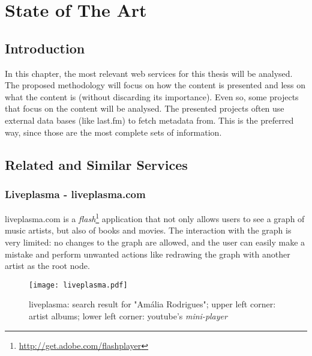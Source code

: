 
\chapter{State of The Art} \label{chap:chap2}

\section*{}


\section{Introduction}

In this chapter, the most relevant web services for this thesis will be analysed.
The proposed methodology will focus on how the content is presented and less on what the content is (without discarding its importance).
Even so, some projects that focus on the content will be analysed.
The presented projects often use external data bases (like last.fm) to fetch metadata from.
This is the preferred way, since those are the most complete sets of information. 

\section{Related and Similar Services} %
\label{sec:related_similar_services}

  \subsection{Liveplasma - liveplasma.com} %
  \label{sub:liveplasma}

    liveplasma.com is a \emph{flash}\footnote{\url{http://get.adobe.com/flashplayer}} application that not only allows users to see a graph of music artists, but also of books and movies.
    The interaction with the graph is very limited: no changes to the graph are allowed, and the user can easily make a mistake and perform unwanted actions like redrawing the graph with another artist as the root node.

    \begin{figure}
      \begin{center}
        \texttt{[image: liveplasma.pdf]}
      \end{center}
      \caption{liveplasma: search result for "Amália Rodrigues"; upper left corner: artist albums; lower left corner: youtube's \emph{mini-player}}
      \label{fig:sota_liveplasma}
    \end{figure}

